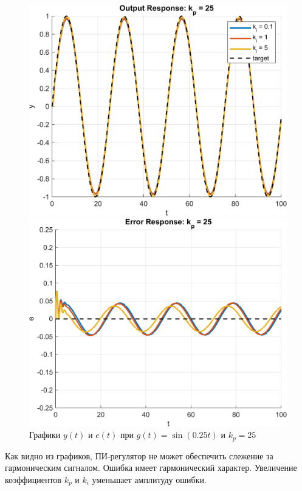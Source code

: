 \begin{figure}[H]
    \centering
    \begin{minipage}{0.45\textwidth}
        \centering
        \includegraphics[width=1\textwidth, trim={1cm 0cm 1cm 0cm}]{../images/input_4_kp_25_output.png}
    \end{minipage}
    \hfill
    \begin{minipage}{0.45\textwidth}
        \centering
        \includegraphics[width=1\textwidth, trim={1cm 0cm 1cm 0cm}]{../images/input_4_kp_25_error.png}
    \end{minipage}
    \caption{Графики $y(t)$ и $e(t)$ при $g(t) = \sin(0.25t)$ и $k_p = 25$}
\end{figure}

Как видно из графиков, ПИ-регулятор не может обеспечить 
слежение за гармоническим сигналом. Ошибка имеет гармонический характер.
Увеличение коэффициентов $k_p$ и $k_i$ уменьшает амплитуду ошибки.
\endinput
